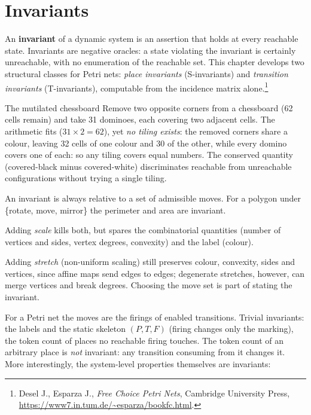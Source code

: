 \section{Invariants}

An \textbf{invariant} of a dynamic system is an assertion that holds at every reachable state. Invariants are negative oracles: a state violating the invariant is certainly unreachable, with no enumeration of the reachable set. This chapter develops two structural classes for Petri nets: \emph{place invariants} (S-invariants) and \emph{transition invariants} (T-invariants), computable from the incidence matrix alone.\footnote{Desel J., Esparza J., \emph{Free Choice Petri Nets}, Cambridge University Press, \url{https://www7.in.tum.de/~esparza/bookfc.html}.}

\begin{examplebox}{The mutilated chessboard}
Remove two opposite corners from a chessboard (62 cells remain) and take 31 dominoes, each covering two adjacent cells. The arithmetic fits ($31 \times 2 = 62$), yet \emph{no tiling exists}: the removed corners share a colour, leaving 32 cells of one colour and 30 of the other, while every domino covers one of each: so any tiling covers equal numbers. The conserved quantity (covered-black minus covered-white) discriminates reachable from unreachable configurations without trying a single tiling.
\end{examplebox}

An invariant is always relative to a set of admissible moves. For a polygon under \{rotate, move, mirror\} the perimeter and area are invariant.

Adding \emph{scale} kills both, but spares the combinatorial quantities (number of vertices and sides, vertex degrees, convexity) and the label (colour).

Adding \emph{stretch} (non-uniform scaling) still preserves colour, convexity, sides and vertices, since affine maps send edges to edges; degenerate stretches, however, can merge vertices and break degrees. Choosing the move set is part of stating the invariant.

For a Petri net the moves are the firings of enabled transitions. Trivial invariants: the labels and the static skeleton $(P, T, F)$ (firing changes only the marking), the token count of places no reachable firing touches. The token count of an arbitrary place is \emph{not} invariant: any transition consuming from it changes it. More interestingly, the system-level properties themselves are invariants:

